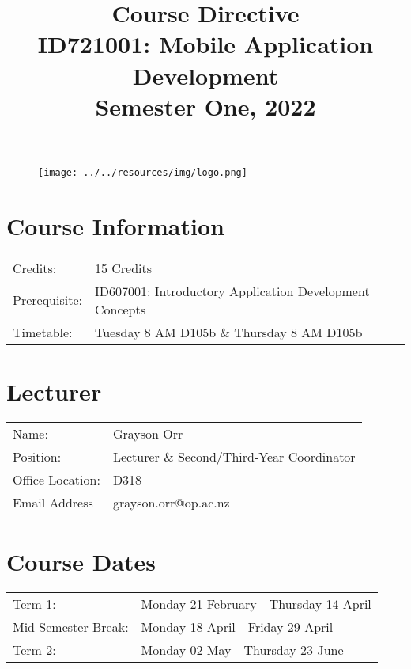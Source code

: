 \documentclass{article}
\author{}
\begin{document}
\begin{figure}
	\texttt{[image: ../../resources/img/logo.png]}
\end{figure}

\title{Course Directive\\ID721001: Mobile Application Development\\Semester One, 2022}
\date{}
\maketitle

\section*{Course Information}
\begin{tabular}{ll}
	Credits:      & 15 Credits                                              \\
	Prerequisite: & ID607001: Introductory Application Development Concepts \\
	Timetable:    & Tuesday 8 AM D105b \& Thursday 8 AM D105b
\end{tabular}

\section*{Lecturer}
\begin{tabular}{ll}
	Name:            & Grayson Orr                               \\
	Position:        & Lecturer \& Second/Third-Year Coordinator \\
	Office Location: & D318                                      \\
	Email Address    & grayson.orr@op.ac.nz                      \\
\end{tabular}

\section*{Course Dates}
\begin{tabular}{ll}
	Term 1:             & Monday 21 February - Thursday 14 April \\
	Mid Semester Break: & Monday 18 April - Friday 29 April      \\
	Term 2:             & Monday 02 May - Thursday 23 June       \\
\end{tabular}
\end{document}
